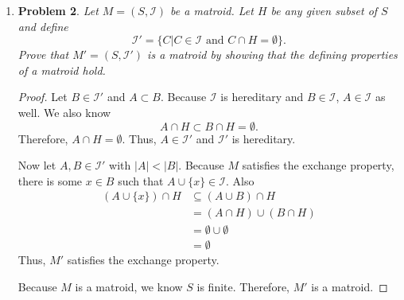\documentclass[a4paper]{article}
\newtheorem*{problem}{Problem}
\begin{document}
\begin{enumerate}
\begin{problem}
    \end{problem}

    \begin{proof}

    Take a set $B \in \mathcal{I}$ and $A \subset B$. $A \cap S_i \subset B \cap S_i$ for all $i$. Therefore,
    \[ \left| A \cap S_i \right| \leq \left| B \cap S_i \right| \leq 1 \]
    for $1 \leq i \leq k$. Then $A \in \mathcal{I}$, and $\mathcal{I}$ is hereditary.

    Now take $A, B \in \mathcal{I}$ with $|A| < |B|$. Because $|A| < |B|$, there is some $j$ such that $|B \cap S_j| = 1$ and $|A \cap S_j| = 0$. Let
    $x = B \cap S_j$. Define $A' = A \cup \{x\}$. Then $A' \cap S_j = \{x\}$. Therefore, $A'$ satisfies $|A' \cap S_i| \leq 1$ for all $i$. Thus, $A' \in \mathcal{I}$ and $M$ satisfies the
    exchange property.

    Because $S$ is assumed to be finite, $\mathcal{I}$ is hereditary, and $M$ satisfies the exchange property, we know $M$ is a matroid.

    \end{proof}

    \pagebreak

  \item
    \begin{problem}

      Let $M = (S, \mathcal{I})$ be a matroid. Let $H$ be any given subset of $S$ and define
      \[ \mathcal{I}' = \{ C | C \in \mathcal{I} \text{ and } C \cap H = \emptyset \} . \]
      Prove that $M' = ( S, \mathcal{I}')$ is a matroid by showing that the defining properties of a matroid hold.

    \end{problem}

    \begin{proof}

      Let $B \in \mathcal{I}'$ and $A \subset B$. Because $\mathcal{I}$ is hereditary and $B \in \mathcal{I}$, $A \in \mathcal{I}$ as well. We also know
      \[ A \cap H \subset B \cap H = \emptyset .\]
      Therefore, $A \cap H = \emptyset$. Thus, $A \in \mathcal{I}'$ and $\mathcal{I}'$ is hereditary.

      Now let $A, B \in \mathcal{I'}$ with $|A| < |B|$. Because $M$ satisfies the exchange property, there is some $x \in B$ such that $A
      \cup \{x\} \in \mathcal{I}$. Also
      \begin{align*}
        \left( A \cup \{x\} \right) \cap H &\subseteq \left( A \cup B \right) \cap H \\
        &= \left( A \cap H \right) \cup \left( B \cap H \right) \\
        &= \emptyset \cup \emptyset \\
        &= \emptyset
      \end{align*}
      Thus, $M'$ satisfies the exchange property.

      Because $M$ is a matroid, we know $S$ is finite. Therefore, $M'$ is a matroid.

    \end{proof}

\end{enumerate}
\end{document}
